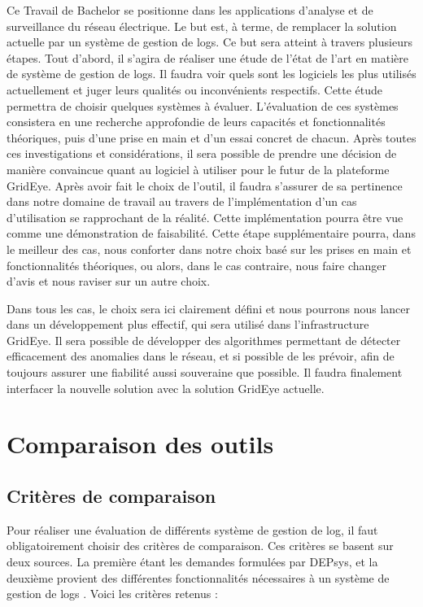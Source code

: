 \documentclass[paper=a4, fontsize=11pt]{scrartcl}
\begin{document}
Ce Travail de Bachelor se positionne dans les applications d'analyse et de surveillance du réseau électrique. Le but est, à terme, de remplacer la solution actuelle par un système de gestion de logs. Ce but sera atteint à travers plusieurs étapes. Tout d'abord, il s'agira de réaliser une étude de l'état de l'art en matière de système de gestion de logs. Il faudra voir quels sont les logiciels les plus utilisés actuellement et juger leurs qualités ou inconvénients respectifs. Cette étude permettra de choisir quelques systèmes à évaluer. L'évaluation de ces systèmes consistera en une recherche approfondie de leurs capacités et fonctionnalités théoriques, puis d'une prise en main et d'un essai concret de chacun. Après toutes ces investigations et considérations, il sera possible de prendre une décision de manière convaincue quant au logiciel à utiliser pour le futur de la plateforme GridEye.
Après avoir fait le choix de l'outil, il faudra s'assurer de sa pertinence dans notre domaine de travail au travers de l'implémentation d'un cas d'utilisation se rapprochant de la réalité. Cette implémentation pourra être vue comme une démonstration de faisabilité.
Cette étape supplémentaire pourra, dans le meilleur des cas, nous conforter dans notre choix basé sur les prises en main et fonctionnalités théoriques, ou alors, dans le cas contraire, nous faire changer d'avis et nous raviser sur un autre choix.

Dans tous les cas, le choix sera ici clairement défini et nous pourrons nous lancer dans un développement plus effectif, qui sera utilisé dans l'infrastructure GridEye. Il sera possible de développer des algorithmes permettant de détecter efficacement des anomalies dans le réseau, et si possible de les prévoir, afin de toujours assurer une fiabilité aussi souveraine que possible. Il faudra finalement interfacer la nouvelle solution avec la solution GridEye actuelle.

\newpage

\section{Comparaison des outils}

\subsection{Critères de comparaison}

Pour réaliser une évaluation de différents système de gestion de log, il faut obligatoirement choisir des critères de comparaison. Ces critères se basent sur deux sources. La première étant les demandes formulées par DEPsys, et la deuxième provient des différentes fonctionnalités nécessaires à un système de gestion de logs \cite{noauthor_what_nodate} \cite{noauthor_gestion_2019}. Voici les critères retenus :
\end{document}

